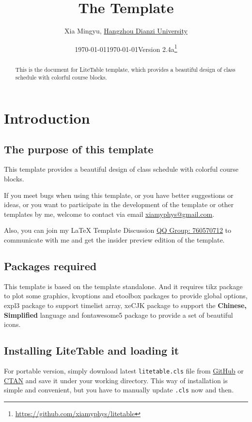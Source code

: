 \documentclass[11pt]{article}
\title{\bfseries The \pkg{LiteTable} Template}
\author{Xia Mingyu, \href{https://www.hdu.edu.cn}{Hangzhou Dianzi University}}
\date{\today}
\affil{\href{mailto:xiamyphys@gmail.com}{\ttfamily xiamyphys@gmail.com}}
\date{\today\quad Version 2.4a\thanks{%
  \url{https://github.com/xiamyphys/litetable}}}
\def\pkg#1{\texorpdfstring{\textcolor{pkgcolor}{\textsf{#1}}}{“#1”}}
\def\cmd#1{\texorpdfstring{\textcolor{cmdcolor}{\textsf{#1}}}{“#1”}}
\begin{document}
\maketitle

\vspace{-2em}
\begin{abstract}
This is the document for \pkg{LiteTable} template, which provides a beautiful design of class schedule with colorful course blocks.
\end{abstract}

\tableofcontents

\clearpage

\section{Introduction}

\subsection{The purpose of this template}
This template provides a beautiful design of class schedule with colorful course blocks.

If you meet bugs when using this template, or you have better suggestions or ideas, or you want to participate in the development of the template or other templates by me, welcome to contact via email \href{mailto:xiamyphys@gmail.com}{\ttfamily xiamyphys@gmail.com}.

Also, you can join my \textsf\LaTeX{} Template Discussion \href{https://qm.qq.com/q/OnHzbNvVAG}{QQ Group: 760570712} to communicate with me and get the insider preview edition of the template.

\subsection{Packages required}
This template is based on the template \pkg{standalone}. And it requires \pkg{tikz} package to plot some graphics, \pkg{kvoptions} and \pkg{etoolbox} packages to provide global options, \pkg{expl3} package to support \cmd{timelist} array, \pkg{xeCJK} package to support the \textbf{Chinese, Simplified} language and \pkg{fontawesome5} package to provide a set of beautiful icons.

\subsection{Installing \pkg{LiteTable} and loading it}
For portable version, simply download latest \verb|litetable.cls| file from \href{https://github.com/xiamyphys/LiteTable}{GitHub} or \href{https://ctan.org/pkg/litetable}{CTAN} and save it under your working directory. This way of installation is simple and convenient, but you have to manually update \verb|.cls| now and then.
\end{document}
